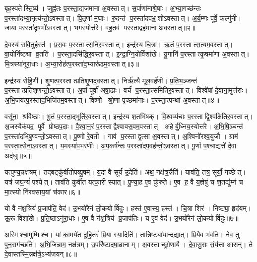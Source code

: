 बृह॒स्पतेस्ति॒ष्य॑। जुह्व॑तः प॒रस्ता॒द्यज॑माना अ॒वस्तात्। स॒र्पाणा॑माश्रे॒षाः। अ॒भ्या॒गच्छ॑न्तः प॒रस्ता॑दभ्या॒नृत्य॑न्तो॒\-ऽवस्तात्। पि॒तृ॒णां म॒घाः। रु॒दन्त॑ प॒रस्ता॑दपभ्र॒शो॑ऽवस्तात्। अ॒र्य॒म्णः पूर्वे॒ फल्गु॑नी। जा॒या प॒रस्ता॑दृष॒भो॑ऽवस्तात्। भग॒स्योत्त॑रे। व॒ह॒तव॑ प॒रस्ता॒द्वह॑माना अ॒वस्तात्॥२॥

दे॒वस्य॑ सवि॒तुर्\mbox{}हस्त॑। प्र॒स॒वः प॒रस्तात्स॒निर॒वस्तात्। इन्द्र॑स्य चि॒त्रा। ऋ॒तं प॒रस्तात्स॒त्यम॒वस्तात्। वा॒योर्निष्ट्या व्र॒तति॑। प॒रस्ता॒दसि॑द्धिर॒वस्तात्। इ॒न्द्रा॒ग्नि॒योर्विशा॑खे। यु॒गानि॑ प॒रस्तात्कृ॒षमा॑णा अ॒वस्तात्। मि॒त्रस्या॑नूरा॒धाः। अ॒भ्या॒रोह॑त्प॒रस्ता॑द॒भ्यारू॑ढम॒वस्तात्॥३॥

इन्द्र॑स्य रोहि॒णी। शृ॒णत्प॒रस्तात्प्रतिशृ॒णद॒वस्तात्। निर्\mbox{}ऋ॑त्यै मूल॒वर्\mbox{}ह॑णी। प्र॒ति॒भ॒ञ्जन्त॑ प॒रस्तात्प्रतिशृ॒णन्तो॒ऽवस्तात्। अ॒पां पूर्वा॑ अषा॒ढाः। वर्च॑ प॒रस्ता॒त्समि॑तिर॒वस्तात्। विश्वे॑षां दे॒वाना॒मुत्त॑राः। अ॒भि॒जय॑त्प॒रस्ता॑द॒भिजि॑तम॒वस्तात्। विष्णो श्रो॒णा पृ॒च्छमा॑नाः। प॒रस्ता॒त्पन्था॑ अ॒वस्तात्॥४॥

वसू॑ना॒ श्रवि॑ष्ठाः। भू॒तं प॒रस्ता॒द्भूति॑र॒वस्तात्। इन्द्र॑स्य श॒तभि॑षक्। वि॒श्वव्य॑चाः प॒रस्ताद्वि॒श्वक्षि॑तिर॒वस्तात्। अ॒जस्यैक॑पद॒ पूर्वे प्रोष्ठप॒दाः। वै॒श्वा॒न॒रं प॒रस्ताद्वैश्वावस॒वम॒\-वस्तात्। अहेर्बु॒ध्निय॒स्योत्त॑रे। अ॒भि॒षि॒ञ्चन्त॑ प॒रस्ता॑दभि\-षु॒ण्वन्तो॒ऽवस्तात्। पू॒ष्णो रे॒वती। गाव॑ प॒रस्ताद्व॒त्सा अ॒वस्तात्। अ॒श्विनो॑रश्व॒युजौ। ग्राम॑ प॒रस्ता॒त्सेना॒ऽवस्तात्। य॒मस्या॑प॒भर॑णीः। अ॒प॒कर्\mbox{}ष॑न्तः प॒रस्ता॑दप॒वह॑न्तो॒ऽवस्तात्। पू॒र्णा प॒श्चाद्यत्ते॑ दे॒वा अद॑धुः॥५॥\anuvakamend[आ॒र्द्रम॒वस्ता॒द्वह॑माना अ॒वस्ता॑द॒भ्यारू॑ढम॒वस्ता॒त्पन्था॑ अ॒वस्ताद्व॒त्सा अ॒वस्ता॒त्पञ्च॑ च]

यत्पुण्य॒न्नक्ष॑त्रम्। तद्बट्कु॑र्वीतोपव्यु॒षम्। य॒दा वै सूर्य॑ उ॒देति॑। अथ॒ नक्ष॑त्र॒न्नैति॑। याव॑ति॒ तत्र॒ सूर्यो॒ गच्छेत्। यत्र॑ जघ॒न्यं॑ पश्येत्। ताव॑ति कुर्वीत यत्का॒री स्यात्। पु॒ण्या॒ह ए॒व कु॑रुते। ए॒व ह॒ वै य॒ज्ञेषुं च श॒तद्यु॑म्नं च मा॒त्स्यो नि॑रवसाय॒यां च॑कार॥६॥

यो वै न॑क्ष॒त्रियं॑ प्र॒जाप॑तिं॒ वेद॑। उ॒भयो॑रेनं लो॒कयोर्विदुः। हस्त॑ ए॒वास्य॒ हस्त॑। चि॒त्रा शिर॑। निष्ट्या॒ हृद॑यम्। ऊ॒रू विशा॑खे। प्र॒ति॒ष्ठाऽनू॑रा॒धाः। ए॒ष वै न॑क्ष॒त्रिय॑ प्र॒जाप॑तिः। य ए॒वं वेद॑। उ॒भयो॑रेनं लो॒कयोर्विदुः॥७॥

अ॒स्मिश्चा॒मुष्मिश्च। यां का॒मये॑त दुहि॒तरं॑ प्रि॒या स्या॒दिति॑। तान्निष्ट्या॑यान्दद्यात्। प्रि॒यैव भ॑वति। नेव॒ तु पुन॒राग॑च्छति। अ॒भि॒जिन्नाम॒ नक्ष॑त्रम्। उ॒परि॑ष्टादषा॒ढानाम्। अ॒वस्ताच्छ्रो॒णायै। दे॒वा॒सु॒राः सं॒य॑त्ता आसन्। ते दे॒वास्तस्मि॒न्नक्ष॑त्रे॒ऽभ्य॑जयन्॥८॥

